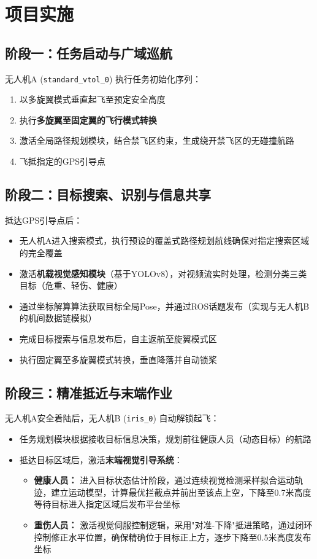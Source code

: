 \documentclass[12pt]{article}
\begin{document}
\section{项目实施}
\subsection{阶段一：任务启动与广域巡航}
无人机A (\texttt{standard\_vtol\_0}) 执行任务初始化序列：
\begin{enumerate}
    \item 以多旋翼模式垂直起飞至预定安全高度
    \item 执行\textbf{多旋翼至固定翼的飞行模式转换}
    \item 激活全局路径规划模块，结合禁飞区约束，生成绕开禁飞区的无碰撞航路
    \item 飞抵指定的GPS引导点
\end{enumerate}

\subsection{阶段二：目标搜索、识别与信息共享}
抵达GPS引导点后：
\begin{itemize}
    \item 无人机A进入搜索模式，执行预设的覆盖式路径规划航线确保对指定搜索区域的完全覆盖
    \item 激活\textbf{机载视觉感知模块}（基于YOLOv8），对视频流实时处理，检测分类三类目标（危重、轻伤、健康）
    \item 通过坐标解算算法获取目标全局Pose，并通过ROS话题发布（实现与无人机B的机间数据链模拟）
    \item 完成目标搜索与信息发布后，自主返航至旋翼模式区
    \item 执行固定翼至多旋翼模式转换，垂直降落并自动锁桨
\end{itemize}

\subsection{阶段三：精准抵近与末端作业}
无人机A安全着陆后，无人机B (\texttt{iris\_0}) 自动解锁起飞：
\begin{itemize}
    \item 任务规划模块根据接收目标信息决策，规划前往健康人员（动态目标）的航路
    \item 抵达目标区域后，激活\textbf{末端视觉引导系统}：
    \begin{itemize}
        \item \textbf{健康人员：} 进入目标状态估计阶段，通过连续视觉检测采样拟合运动轨迹，建立运动模型，计算最优拦截点并前出至该点上空，下降至0.7米高度等待目标进入指定区域后发布平台坐标
        \item \textbf{重伤人员：} 激活视觉伺服控制逻辑，采用"对准-下降"抵进策略，通过闭环控制修正水平位置，确保精确位于目标正上方，逐步下降至0.5米高度发布坐标
    \end{itemize}
\end{itemize}
\end{document}
